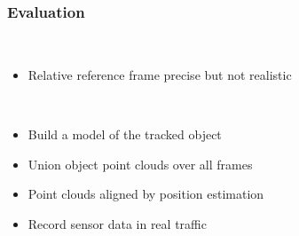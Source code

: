 \begin{frame}
  \frametitle{Evaluation}
  \begin{description}[]
  \item[] \hfill \\
  \begin{itemize}
  \item Relative reference frame precise but not realistic
  \end{itemize}
  \pause
  \item[Model Crispness Approach] \hfill \\
  \begin{itemize}
  \item Build a model of the tracked object
  \item Union object point clouds over all frames
  \item Point clouds aligned by position estimation
  \item Record sensor data in real traffic
  \end{itemize}
  \end{description}
\end{frame}

